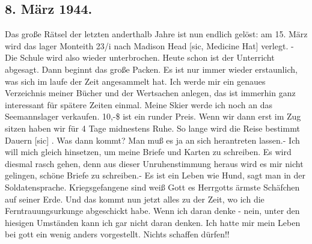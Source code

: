 \subsection{8. M\"{a}rz 1944.}

Das gro{\ss}e R\"{a}tsel der letzten anderthalb Jahre ist nun endlich gel\"{o}st: am 15. M\"{a}rz wird das lager Monteith 23/i nach Madison Head {\color{red} [sic, Medicine Hat] } verlegt.
- Die Schule wird also wieder unterbrochen.
Heute schon ist der Unterricht abgesagt.
Dann beginnt das gro{\ss}e Packen.
Es ist nur immer wieder erstaunlich, was sich im laufe der Zeit angesammelt hat.
Ich werde mir ein genaues Verzeichnis meiner B\"{u}cher und der Wertsachen anlegen, das ist immerhin ganz interessant f\"{u}r sp\"{a}tere Zeiten einmal.
Meine Skier werde ich noch an das Seemannslager verkaufen.
10,-{\$} ist ein runder Preis.
Wenn wir dann erst im Zug sitzen haben wir f\"{u}r 4 Tage midnestens Ruhe.
So lange wird die Reise bestimmt Dauern{\color{red} [sic] }.
Was dann kommt?
Man mu{\ss} es ja an sich herantreten lassen.-
Ich will mich gleich hinsetzen, um meine Briefe und Karten zu schreiben.
Es wird diesmal rasch gehen, denn aus dieser Unruhenstimmung heraus wird es mir nicht gelingen, sch\"{o}ne Briefe zu schreiben.-
Es ist ein Leben wie Hund, sagt man in der Soldatensprache.
Kriegsgefangene sind wei{\ss} Gott es Herrgotts \"{a}rmste Sch\"{a}fchen auf seiner Erde.
Und das kommt nun jetzt alles zu der Zeit, wo ich die Ferntrauungsurkunge abgeschickt habe.
Wenn ich daran denke - nein, unter den hiesigen Umst\"{a}nden kann ich gar nicht daran denken.
Ich hatte mir mein Leben bei gott ein wenig anders vorgestellt.
Nichts schaffen d\"{u}rfen!!

\clearpage
